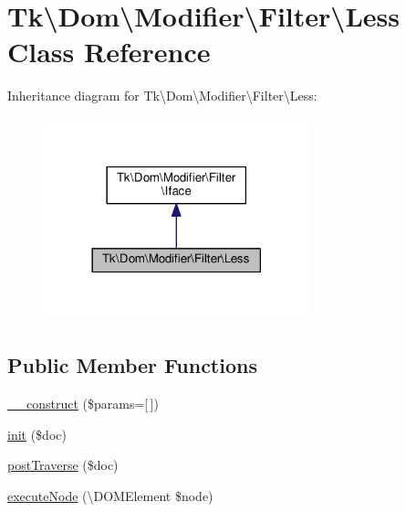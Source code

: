 \hypertarget{classTk_1_1Dom_1_1Modifier_1_1Filter_1_1Less}{\section{Tk\textbackslash{}Dom\textbackslash{}Modifier\textbackslash{}Filter\textbackslash{}Less Class Reference}
\label{classTk_1_1Dom_1_1Modifier_1_1Filter_1_1Less}
}


Inheritance diagram for Tk\textbackslash{}Dom\textbackslash{}Modifier\textbackslash{}Filter\textbackslash{}Less\+:\nopagebreak
\begin{figure}[H]
\begin{center}
\leavevmode
\includegraphics[width=218pt]{classTk_1_1Dom_1_1Modifier_1_1Filter_1_1Less__inherit__graph}
\end{center}
\end{figure}
\subsection*{Public Member Functions}
\begin{DoxyCompactItemize}
\item 
\hyperlink{classTk_1_1Dom_1_1Modifier_1_1Filter_1_1Less_ae007e67e49b51c82b551802e0c6f3e70}{\+\_\+\+\_\+construct} (\$params=\mbox{[}$\,$\mbox{]})
\item 
\hyperlink{classTk_1_1Dom_1_1Modifier_1_1Filter_1_1Less_a4145891a4053c8fb9b16df082d70509d}{init} (\$doc)
\item 
\hyperlink{classTk_1_1Dom_1_1Modifier_1_1Filter_1_1Less_add51f9a357800ef817e96ff27ff71aab}{post\+Traverse} (\$doc)
\item 
\hyperlink{classTk_1_1Dom_1_1Modifier_1_1Filter_1_1Less_a7e21211c6e12cd941250eb2b7a82e84b}{execute\+Node} (\textbackslash{}D\+O\+M\+Element \$node)
\end{DoxyCompactItemize}
